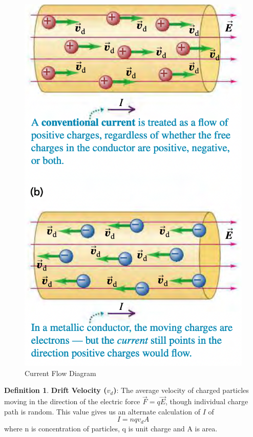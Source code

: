 \documentclass[12pt]{amsart}
\theoremstyle{definition}
\newtheorem{definition}{Definition} %
\numberwithin{equation}{theorem}    %
\begin{document}
 \begin{figure}[H]
    \centering
    \includegraphics[width=5in]{Media/Current.png}
    \caption{Current Flow Diagram}
    \label{Current Flow Diagram}
\end{figure}


 \begin{definition}
    \textbf{Drift Velocity ($v_d$)}:
    The average velocity of charged particles moving in the direction of the 
    electric force $\vec{F} = q\vec{E}$, though individual charge path is random. 
    This value gives us an alternate calculation of $I$ of 
    $$I = nqv_dA$$ where n is concentration of particles, q is unit charge and A is area.
 \end{definition}
\end{document}
